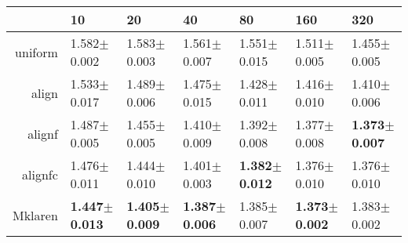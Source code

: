 \begin{table}[ht]
\centering
\begin{tabular}{rllllll}
  \hline
 & 10 & 20 & 40 & 80 & 160 & 320 \\ 
  \hline
uniform & 1.582$\pm$0.002 & 1.583$\pm$0.003 & 1.561$\pm$0.007 & 1.551$\pm$0.015 & 1.511$\pm$0.005 & 1.455$\pm$0.005 \\ 
  align & 1.533$\pm$0.017 & 1.489$\pm$0.006 & 1.475$\pm$0.015 & 1.428$\pm$0.011 & 1.416$\pm$0.010 & 1.410$\pm$0.006 \\ 
  alignf & 1.487$\pm$0.005 & 1.455$\pm$0.005 & 1.410$\pm$0.009 & 1.392$\pm$0.008 & 1.377$\pm$0.008 & \textbf{1.373$\pm$0.007} \\ 
  alignfc & 1.476$\pm$0.011 & 1.444$\pm$0.010 & 1.401$\pm$0.003 & \textbf{1.382$\pm$0.012} & 1.376$\pm$0.010 & 1.376$\pm$0.010 \\ 
  Mklaren & \textbf{1.447$\pm$0.013} & \textbf{1.405$\pm$0.009} & \textbf{1.387$\pm$0.006} & 1.385$\pm$0.007 & \textbf{1.373$\pm$0.002} & 1.383$\pm$0.002 \\ 
   \hline
\end{tabular}
\end{table}
